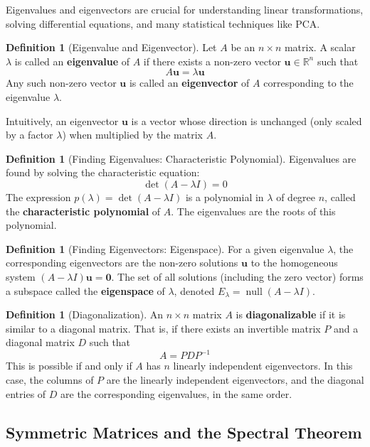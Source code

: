 \documentclass[11pt]{article}
\theoremstyle{definition}
\newtheorem{definition}[theorem]{Definition}
\theoremstyle{remark}
\newcommand{\R}{\mathbb{R}}
\newcommand{\detm}{\operatorname{det}}
\newcommand{\nul}{\operatorname{null}}
\begin{document}
Eigenvalues and eigenvectors are crucial for understanding linear transformations, solving differential equations, and many statistical techniques like PCA.

\begin{definition}[Eigenvalue and Eigenvector]
Let $A$ be an $n \times n$ matrix. A scalar $\lambda$ is called an \textbf{eigenvalue} of $A$ if there exists a non-zero vector $\mathbf{u} \in \R^n$ such that
\[ A \mathbf{u} = \lambda \mathbf{u} \]
Any such non-zero vector $\mathbf{u}$ is called an \textbf{eigenvector} of $A$ corresponding to the eigenvalue $\lambda$.
\end{definition}
Intuitively, an eigenvector $\mathbf{u}$ is a vector whose direction is unchanged (only scaled by a factor $\lambda$) when multiplied by the matrix $A$.

\begin{definition}[Finding Eigenvalues: Characteristic Polynomial]
Eigenvalues are found by solving the characteristic equation:
\[ \detm(A - \lambda I) = 0 \]
The expression $p(\lambda) = \detm(A - \lambda I)$ is a polynomial in $\lambda$ of degree $n$, called the \textbf{characteristic polynomial} of $A$. The eigenvalues are the roots of this polynomial.
\end{definition}

\begin{definition}[Finding Eigenvectors: Eigenspace]
For a given eigenvalue $\lambda$, the corresponding eigenvectors are the non-zero solutions $\mathbf{u}$ to the homogeneous system $(A - \lambda I)\mathbf{u} = \mathbf{0}$. The set of all solutions (including the zero vector) forms a subspace called the \textbf{eigenspace} of $\lambda$, denoted $E_\lambda = \nul(A - \lambda I)$.
\end{definition}

\begin{definition}[Diagonalization]
An $n \times n$ matrix $A$ is \textbf{diagonalizable} if it is similar to a diagonal matrix. That is, if there exists an invertible matrix $P$ and a diagonal matrix $D$ such that
\[ A = P D P^{-1} \]
This is possible if and only if $A$ has $n$ linearly independent eigenvectors. In this case, the columns of $P$ are the linearly independent eigenvectors, and the diagonal entries of $D$ are the corresponding eigenvalues, in the same order.
\end{definition}

\subsection{Symmetric Matrices and the Spectral Theorem}
\end{document}

